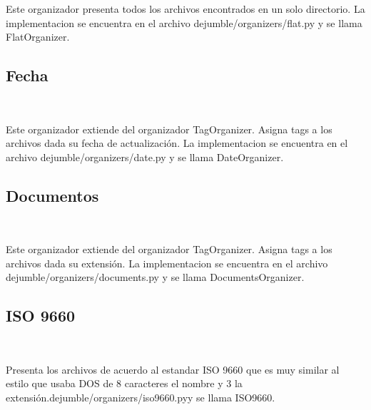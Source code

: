 Este organizador presenta todos los archivos encontrados en un solo directorio. La implementacion se encuentra en el archivo dejumble/organizers/flat.py y se llama FlatOrganizer.

\subsection{Fecha}
\label{fecha}

Este organizador extiende del organizador TagOrganizer. Asigna tags a los archivos dada su fecha de actualización. La implementacion se encuentra en el archivo dejumble/organizers/date.py y se llama DateOrganizer.

\subsection{Documentos}
\label{documentos}

Este organizador extiende del organizador TagOrganizer. Asigna tags a los archivos dada su extensión. La implementacion se encuentra en el archivo dejumble/organizers/documents.py y se llama DocumentsOrganizer.

\subsection{ISO 9660}
\label{iso9660}

Presenta los archivos de acuerdo al estandar ISO 9660 que es muy similar al estilo que usaba DOS de 8 caracteres el nombre y 3 la extensión.dejumble/organizers/iso9660.pyy se llama ISO9660.

